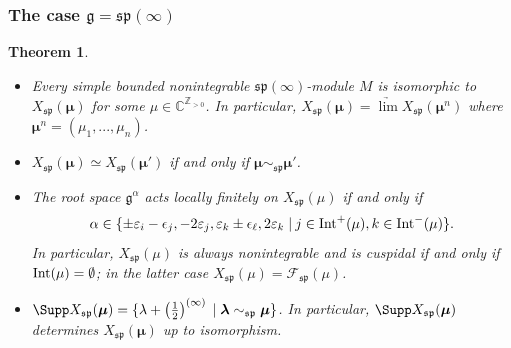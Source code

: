 \documentclass[12pt]{amsart}
\newcommand{\C}{{\mathbb C}}
\def\gg{\mathfrak{g}}
\newtheorem{thm}{Theorem}[section]
\begin{document}
\subsubsection{The case  $\gg = \mathfrak{sp} (\infty)$}



\begin{thm} \label{thm-bounded-infinite-sp}
\begin{itemize} 
\item[(i)]  Every simple bounded nonintegrable $\mathfrak{sp} (\infty)$-module  $M$ is isomorphic  to $X_{\mathfrak{sp}}(\boldsymbol{\mu})$ for some $\mu \in \C^{{\mathbb Z}_{>0}}$. In particular,  $X_{\mathfrak{sp}}(\boldsymbol{\mu}) = \underrightarrow\lim X_{\mathfrak{sp}}(\boldsymbol{\mu}^n)$ where $\boldsymbol{\mu}^n = (\mu_1,...,\mu_n)$.
\item[(ii)] 
$X_{\mathfrak{sp}}(\boldsymbol{\mu}) \simeq X_{\mathfrak{sp}}(\boldsymbol{\mu}')$  if and only if $\boldsymbol{\mu} \sim_{\mathfrak{sp}} \boldsymbol{\mu'}$.
\item[(iii)] The root space $\gg^{\alpha}$ acts locally finitely on $X_{\mathfrak{sp}}(\mu)$ if and only if 
$$\alpha \in \{\pm \varepsilon_i - \epsilon_j, - 2 \varepsilon_j,  \varepsilon_k \pm  \epsilon_\ell, 2 \varepsilon_k  \; | \: j  \in  {\rm Int}^+ (\mu),  k  \in  {\rm Int}^- (\mu)\}.
$$
In particular, $X_{\mathfrak{sp}}(\mu)$ is always nonintegrable and is cuspidal if and only if $ {\rm Int} (\mu) = \emptyset$; in the latter case $X_{\mathfrak{sp}}(\mu) = {\mathcal F}_{\mathfrak{sp}} (\mu)$.

\item[(iv)] $\Supp X_{\mathfrak{sp}}(\boldsymbol{\mu}) = \{\lambda +\left( \frac{1}{2}\right)^{(\infty)} \; | \; \boldsymbol{\lambda} \sim_{\mathfrak{sp}}  \boldsymbol{\mu} \}$. In particular, $\Supp X_{\mathfrak{sp}}(\boldsymbol{\mu})$ determines $X_{\mathfrak{sp}}(\boldsymbol{\mu})$ up to isomorphism.
\end{itemize}
\end{thm}
\end{document}
